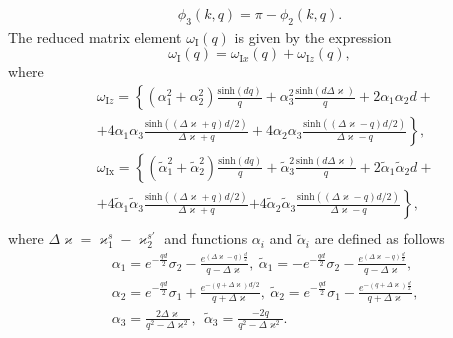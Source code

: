 \documentclass[aps,prb,amsmath,amssymb,twocolumn,superscriptaddress,showpacs,floatfix]{revtex4-1}
\begin{document}
\begin{equation}\label{Eq:InPlaneInt5}
\begin{split}
\phi_3(k,q)=\pi-\phi_2(k,q).
\end{split}
\end{equation}
The reduced matrix element $\omega_\mathrm I (q)$ is given by the expression
\begin{equation}\label{Eq:IntEnTot}
\omega_\mathrm I (q) =\omega_{\mathrm Ix}(q) + \omega_{\mathrm Iz}(q),
\end{equation}
where
\begin{equation}\label{Eq:IntEn}
\begin{split}
&\omega_{\mathrm Iz}=\left\{(\alpha_1^2+\alpha^2_2)\frac{\mathrm{sinh}(dq)}{q}+\alpha_3^2\frac{\mathrm{sinh}(d\Delta\varkappa)}{q}+2\alpha_1\alpha_2d+\right.\\ &\left.+4\alpha_1\alpha_3\frac{\mathrm{sinh}(\!(\Delta\varkappa+q)d/2)}{\Delta\varkappa+q}+4\alpha_2\alpha_3\frac{\mathrm{sinh}(\!(\Delta\varkappa-q)d/2)}{\Delta\varkappa-q}\!\!\right\},\\
&\omega_\mathrm {Ix}=\left\{(\tilde\alpha_1^2+\tilde\alpha^2_2)\frac{\mathrm{sinh}(dq)}{q}+\tilde\alpha_3^2\frac{\mathrm{sinh}(d\Delta\varkappa)}{q}+2\tilde\alpha_1\tilde\alpha_2d+\right.\\&+4\tilde\alpha_1\tilde\alpha_3\frac{\mathrm{sinh}(\!(\Delta\varkappa+q)d/2)}{\Delta\varkappa+q}\left.+4\tilde\alpha_2\tilde\alpha_3\frac{\mathrm{sinh}(\!(\Delta\varkappa-q)d/2)}{\Delta\varkappa-q}\!\!\right\},\\
\end{split}
\end{equation}
where $\Delta\varkappa=\varkappa^s_1-\varkappa^{s'}_2$ and
functions $\alpha_i$ and $\tilde \alpha_i$ are defined as follows
\begin{equation}\label{Eq:IntEn2}
\begin{split}
&\alpha_1\!=e^{-\frac{qd}{2}}\sigma_2-\frac{e^{(\Delta\varkappa-q)\frac{d}{2}}}{q-\Delta\varkappa},~ \tilde \alpha_1\!=-e^{-\frac{qd}{2}}\sigma_2-\frac{e^{(\Delta\varkappa-q)\frac{d}{2}}}{q-\Delta\varkappa},\\
&\alpha_2\!=e^{-\frac{qd}{2}}\sigma_1+\frac{e^{-(q+\Delta\varkappa)d/2}}{q+\Delta\varkappa},~\tilde \alpha_2\!=e^{-\frac{qd}{2}}\sigma_1-\frac{e^{-(q+\Delta\varkappa)\frac{d}{2}}}{q+\Delta\varkappa},\\
&\alpha_3=\frac{2\Delta\varkappa}{q^2-\Delta\varkappa^2}, ~~\tilde \alpha_3=\frac{-2q}{q^2-\Delta\varkappa^2}.
\end{split}
\end{equation}
\end{document}
